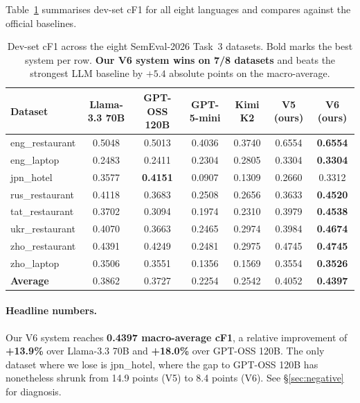 \documentclass[11pt]{article}
\begin{document}
Table~\ref{tab:main} summarises dev-set cF1 for all eight languages
and compares against the official baselines.

\begin{table}[t]
\centering\small
\begin{tabular}{lcccccc}
\toprule
Dataset & Llama-3.3 70B & GPT-OSS 120B & GPT-5-mini & Kimi K2 & V5 (ours) & \textbf{V6 (ours)} \\
\midrule
eng\_restaurant & 0.5048 & 0.5013 & 0.4036 & 0.3740 & 0.6554 & \textbf{0.6554} \\
eng\_laptop     & 0.2483 & 0.2411 & 0.2304 & 0.2805 & 0.3304 & \textbf{0.3304} \\
jpn\_hotel      & 0.3577 & \textbf{0.4151} & 0.0907 & 0.1309 & 0.2660 & 0.3312 \\
rus\_restaurant & 0.4118 & 0.3683 & 0.2508 & 0.2656 & 0.3633 & \textbf{0.4520} \\
tat\_restaurant & 0.3702 & 0.3094 & 0.1974 & 0.2310 & 0.3979 & \textbf{0.4538} \\
ukr\_restaurant & 0.4070 & 0.3663 & 0.2465 & 0.2974 & 0.3984 & \textbf{0.4674} \\
zho\_restaurant & 0.4391 & 0.4249 & 0.2481 & 0.2975 & 0.4745 & \textbf{0.4745} \\
zho\_laptop     & 0.3506 & 0.3551 & 0.1356 & 0.1569 & 0.3554 & \textbf{0.3526} \\
\midrule
\textbf{Average} & 0.3862 & 0.3727 & 0.2254 & 0.2542 & 0.4052 & \textbf{0.4397} \\
\bottomrule
\end{tabular}
\caption{Dev-set cF1 across the eight SemEval-2026 Task~3 datasets.
Bold marks the best system per row. \textbf{Our V6 system wins on
7/8 datasets} and beats the strongest LLM baseline by $+5.4$ absolute
points on the macro-average.}
\label{tab:main}
\end{table}

\paragraph{Headline numbers.}
Our V6 system reaches \textbf{0.4397 macro-average cF1}, a relative
improvement of \textbf{+13.9\%} over Llama-3.3 70B and \textbf{+18.0\%}
over GPT-OSS 120B. The only dataset where we lose is jpn\_hotel,
where the gap to GPT-OSS 120B has nonetheless shrunk from 14.9 points
(V5) to 8.4 points (V6). See \S\ref{sec:negative} for diagnosis.

\end{document}
